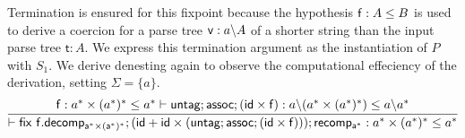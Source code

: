 \begin{example}[Grabmeyer]
Termination is ensured for this fixpoint because the hypothesis $\mathsf{f} : A \leq B$ is used to derive a coercion for a parse tree $ \mathsf{v} : a \backslash A$ of a shorter string than the input parse tree $\mathsf{t} : A$.
We express this termination argument as the instantiation of $P$ with $S_1$. We derive denesting again to observe the computational effeciency of the derivation, setting $\Sigma = \{a\}$.
\[\infer{\contains{}{\fix ~f.decomp_{a^* \times (a^*)^*};(id +  id\times  (\dslcom{untag} ; \dslcom{assoc} ; (\dslcom{id} \times \dslcom{f}))); recomp_{a^*}}{a^* \times (a^*)^*}{a^*}}{\contains{\dslcom{f} : a^* \times (a^*)^* \leq a^*}{\dslcom{untag} ; \dslcom{assoc} ; (\dslcom{id} \times \dslcom{f})}{\derive{a}{(a^* \times (a^*)^*)}}{\derive{a}{a^*}}} \]


\end{example}
